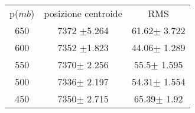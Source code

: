 
\begin{center}
\begin{tabulary}{\textwidth}{CCC}
\toprule
p($mb$) & posizione centroide & RMS \\ 
650 &7372 $\pm$5.264 &61.62$\pm$ 3.722\\
600 &7352 $\pm$1.823 &44.06$\pm$ 1.289\\
550 &7370$\pm$ 2.256 &55.5$\pm$ 1.595\\
500 &7336$\pm$ 2.197 &54.31$\pm$ 1.554\\
450 &7350$\pm$ 2.715 &65.39$\pm$ 1.92\\
\bottomrule
\end{tabulary}
\end{center}
